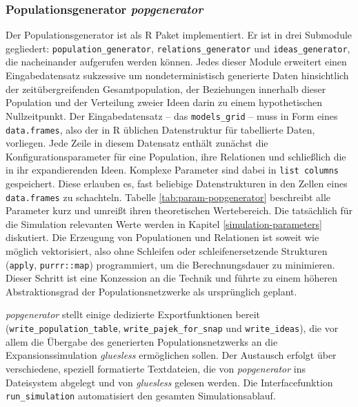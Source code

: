 \documentclass[openany,twoside,twocolumn]{book}
\begin{document}
\hypertarget{popgenerator}{%
\subsubsection{\texorpdfstring{Populationsgenerator
\emph{popgenerator}}{Populationsgenerator popgenerator}}\label{popgenerator}}

Der Populationsgenerator ist als R Paket implementiert. Er ist in drei
Submodule gegliedert: \texttt{population\_generator},
\texttt{relations\_generator} und \texttt{ideas\_generator}, die
nacheinander aufgerufen werden können. Jedes dieser Module erweitert
einen Eingabedatensatz sukzessive um nondeterministisch generierte Daten
hinsichtlich der zeitübergreifenden Gesamtpopulation, der Beziehungen
innerhalb dieser Population und der Verteilung zweier Ideen darin zu
einem hypothetischen Nullzeitpunkt. Der Eingabedatensatz -- das
\texttt{models\_grid} -- muss in Form eines \texttt{data.frames}, also
der in R üblichen Datenstruktur für tabellierte Daten, vorliegen. Jede
Zeile in diesem Datensatz enthält zunächst die Konfigurationsparameter
für eine Population, ihre Relationen und schließlich die in ihr
expandierenden Ideen. Komplexe Parameter sind dabei in
\texttt{list\ columns} gespeichert. Diese erlauben es, fast beliebige
Datenstrukturen in den Zellen eines \texttt{data.frames} zu schachteln.
Tabelle \ref{tab:param-popgenerator} beschreibt alle Parameter kurz und
umreißt ihren theoretischen Wertebereich. Die tatsächlich für die
Simulation relevanten Werte werden in Kapitel
\ref{simulation-parameters} diskutiert. Die Erzeugung von Populationen
und Relationen ist soweit wie möglich vektorisiert, also ohne Schleifen
oder schleifenersetzende Strukturen (\texttt{apply},
\texttt{purrr::map}) programmiert, um die Berechnungsdauer zu
minimieren. Dieser Schritt ist eine Konzession an die Technik und führte
zu einem höheren Abstraktionsgrad der Populationsnetzwerke als
ursprünglich geplant.

\emph{popgenerator} stellt einige dedizierte Exportfunktionen bereit
(\texttt{write\_population\_table}, \texttt{write\_pajek\_for\_snap} und
\texttt{write\_ideas}), die vor allem die Übergabe des generierten
Populationsnetzwerks an die Expansionssimulation \emph{gluesless}
ermöglichen sollen. Der Austausch erfolgt über verschiedene, speziell
formatierte Textdateien, die von \emph{popgenerator} ins Dateisystem
abgelegt und von \emph{gluesless} gelesen werden. Die Interfacefunktion
\texttt{run\_simulation} automatisiert den gesamten Simulationsablauf.
\end{document}
